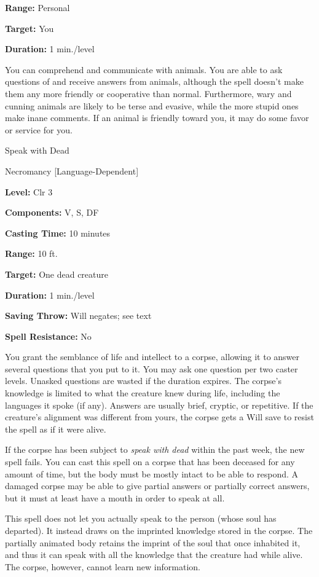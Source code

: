 \documentclass{article}
\begin{document}
\textbf{Range:} Personal

\textbf{Target:} You

\textbf{Duration:} 1 min./level

You can comprehend and communicate with animals. You are able to ask questions 
of and receive answers from animals, although the spell doesn't make them any more 
friendly or cooperative than normal. Furthermore, wary and cunning animals are 
likely to be terse and evasive, while the more stupid ones make inane comments. 
If an animal is friendly toward you, it may do some favor or service for you.

\vspace{12pt}
Speak with Dead

Necromancy [Language-Dependent]

\textbf{Level:} Clr 3

\textbf{Components:} V, S, DF

\textbf{Casting Time:} 10 minutes

\textbf{Range:} 10 ft.

\textbf{Target:} One dead creature

\textbf{Duration:} 1 min./level

\textbf{Saving Throw: }Will negates; see text

\textbf{Spell Resistance:} No

You grant the semblance of life and intellect to a corpse, allowing it to answer 
several questions that you put to it. You may ask one question per two caster levels. 
Unasked questions are wasted if the duration expires. The corpse's knowledge is 
limited to what the creature knew during life, including the languages it spoke 
(if any). Answers are usually brief, cryptic, or repetitive. If the creature's 
alignment was different from yours, the corpse gets a Will save to resist the spell 
as if it were alive.

If the corpse has been subject to \textit{speak with dead }within the past week, 
the new spell fails. You can cast this spell on a corpse that has been deceased 
for any amount of time, but the body must be mostly intact to be able to respond. 
A damaged corpse may be able to give partial answers or partially correct answers, 
but it must at least have a mouth in order to speak at all. 

This spell does not let you actually speak to the person (whose soul has departed). 
It instead draws on the imprinted knowledge stored in the corpse. The partially 
animated body retains the imprint of the soul that once inhabited it, and thus 
it can speak with all the knowledge that the creature had while alive. The corpse, 
however, cannot learn new information.
\end{document}
